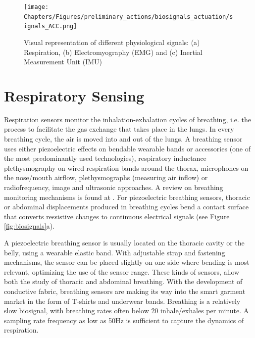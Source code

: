\begin{figure}[htbp]
\centering
\texttt{[image: Chapters/Figures/preliminary\_actions/biosignals\_actuation/signals\_ACC.png]}
\caption{Visual representation of different physiological signals: (a) Respiration, (b) Electromyography (EMG) and (c) Inertial Measurement Unit (IMU)}
\label{fig:biosignals_samples}
\end{figure}


\section{Respiratory Sensing}
\label{sec:respiratory_sensing}

Respiration sensors monitor the inhalation-exhalation cycles of breathing, i.e. the process to facilitate the gas exchange that takes place in the lungs. In every breathing cycle, the air is moved into and out of the lungs. A breathing sensor uses either piezoelectric effects on bendable wearable bands or accessories (one of the most predominantly used technologies), respiratory inductance plethysmography on wired respiration bands around the thorax, microphones on the nose/mouth airflow, plethysmographs (measuring air inflow) or radiofrequency, image and ultrasonic approaches. A review on breathing monitoring mechanisms is found at \cite{massaroni_contact-based_2019}. For piezoelectric breathing sensors, thoracic or abdominal displacements produced in breathing cycles bend a contact surface that converts ressistive changes to continuous electrical signals
(see Figure \ref{fig:biosignals}a).

A piezoelectric breathing sensor is usually located on the thoracic cavity or the belly, using a wearable elastic band. With adjustable strap and fastening mechanisms, the sensor can be placed slightly on one side where bending is most relevant, optimizing the use of the sensor range. These kinds of sensors, allow both the study of thoracic and abdominal breathing. With the development of conductive fabric, breathing sensors are making its way into the smart garment market in the form of T-shirts and underwear bands. Breathing is a relatively slow biosignal, with breathing rates often below 20 inhale/exhales per minute. A sampling rate frequency as low as 50Hz is sufficient to capture the dynamics of respiration.

